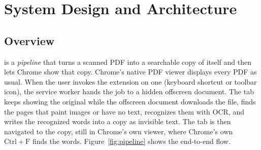 \section{System Design and Architecture}
\label{sec:design}

\subsection{Overview}
\proj{} is a \emph{pipeline} that turns a scanned PDF into a searchable copy of
itself and then lets Chrome show that copy. Chrome's native PDF viewer displays
every PDF as usual. When the user invokes the extension on one (keyboard shortcut
or toolbar icon), the service worker hands the job to a hidden offscreen
document. The tab keeps showing the original while the offscreen document
downloads the file, finds the pages that paint images or have no text,
recognizes them with OCR, and writes the recognized words into a copy as
invisible text. The tab is then navigated to the copy, still in Chrome's own
viewer, where Chrome's own $\mathrm{Ctrl}{+}\mathrm{F}$ finds the words.
Figure~\ref{fig:pipeline} shows the end-to-end flow.

